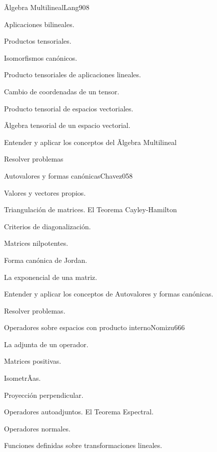 \begin{syllabus}
\begin{unit}{Ãlgebra Multilineal}{Lang90}{8}
   \begin{topics}
         \item  Aplicaciones bilineales.
	 \item  Productos tensoriales.
         \item  Isomorfismos canónicos.
	 \item  Producto tensoriales de aplicaciones lineales.
         \item  Cambio de coordenadas de un tensor.
	 \item  Producto tensorial de espacios vectoriales.
         \item  Ãlgebra tensorial de un espacio vectorial.
   \end{topics}

   \begin{unitgoals}
         \item  Entender y aplicar los conceptos del Ãlgebra Multilineal
         \item  Resolver problemas
   \end{unitgoals}
\end{unit}

\begin{unit}{Autovalores y formas canónicas}{Chavez05}{8}
   \begin{topics}
	\item  Valores y vectores propios.
	\item  Triangulación de matrices. El Teorema Cayley-Hamilton
	\item  Criterios de diagonalización.
	\item  Matrices nilpotentes.
	\item Forma canónica de Jordan.
	\item La exponencial de una matriz.
   \end{topics}

   \begin{unitgoals}
         \item  Entender y aplicar los conceptos de Autovalores y formas canónicas.
         \item  Resolver problemas.
   \end{unitgoals}
\end{unit}

\begin{unit}{Operadores sobre espacios con producto interno}{Nomizu66}{6}
   \begin{topics}
	\item  La adjunta de un operador.
	\item  Matrices positivas.
	\item  IsometrÃ­as.
	\item  Proyección perpendicular.
	\item  Operadores autoadjuntos. El Teorema Espectral.
	\item  Operadores normales.
	\item Funciones definidas sobre transformaciones lineales.
   \end{topics}


\end{unit}
\end{syllabus}
